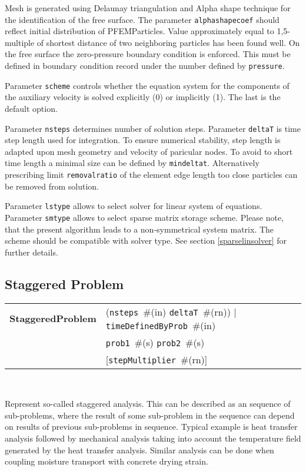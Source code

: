 \documentclass[a4paper]{article}
\makeatletter
\newcommand{\param}[1]{\texttt{#1}} %
\newcommand{\optional}[1]{[#1]} %
\newcommand{\field}[2]{\param{#1}~\#{\tiny(#2)}} %
\newcommand{\optField}[2]{\optional{\field{#1}{#2}}}
\newcommand{\entKeywordInst}[1]{\textbf{#1}} %
\newenvironment{record}[1][]{\begin{tabular}{|ll}}{\end{tabular}\\}
\newcommand{\recentry}[2]{{#1}&{#2}\\}
\newcounter{rcc}
\newenvironment{record}[1][\textwidth]{\setcounter{rcc}{0}\begin{tabular*}{#1}{|ll@{\extracolsep{\fill}}r}}{\end{tabular*}\\}
\newcommand{\recentry}[2]{\ifthenelse{\value{rcc}>0}{&$\backslash$ \\}{\setcounter{rcc}{1}}{#1}&{#2}}
\makeatother
\begin{document}
Mesh is generated using Delaunay triangulation and Alpha shape technique
for the identification of the free surface. The parameter
\param{alphashapecoef} should reflect initial distribution of PFEMParticles.
Value approximately equal to 1,5-multiple of shortest distance of two 
neighboring particles has been found well. On the free surface the zero-pressure
boundary condition is enforced. This  must be defined in boundary condition
record under the number defined by \param{pressure}.

Parameter \param{scheme} controls whether the  equation system for the 
components of the auxiliary velocity is solved explicitly (0) or implicitly
(1). The last is the default option.

Parameter \param{nsteps} determines number of solution
steps. Parameter \param{deltaT} is time step length used for
integration. To ensure numerical stability, step length is adapted upon mesh
geometry and velocity of paricular nodes. To avoid to short time length a minimal
size can be defined by \param{mindeltat}. Alternatively prescribing limit
\param{removalratio} of the element edge length too close particles can be removed
from solution.

Parameter \param{lstype} allows to select solver for linear system of
equations. Parameter \param{smtype} allows to select sparse matrix storage
scheme. Please note, that the present algorithm leads to a
non-symmetrical system
matrix. The scheme should be compatible with solver type. See section
\ref{sparselinsolver} for further details.

\subsection{Staggered Problem}
\label{staggeredproblem}
\begin{record}
  \recentry{\entKeywordInst{StaggeredProblem}}{(\field{nsteps}{in} \field{deltaT}{rn}) $|$ \field{timeDefinedByProb}{in}}
  \recentry{}{\field{prob1}{s} \field{prob2}{s}}
  \recentry{}{\optField{stepMultiplier}{rn}}
\end{record}

Represent so-called staggered analysis. This can be described as an
sequence of sub-problems, where the result of some sub-problem in the
sequence can depend on results of previous sub-problems in sequence.
Typical example is heat transfer analysis followed by mechanical
analysis taking into account the temperature field generated by the
heat transfer analysis. Similar analysis can be done when coupling
moisture transport with concrete drying strain.
\end{document}
